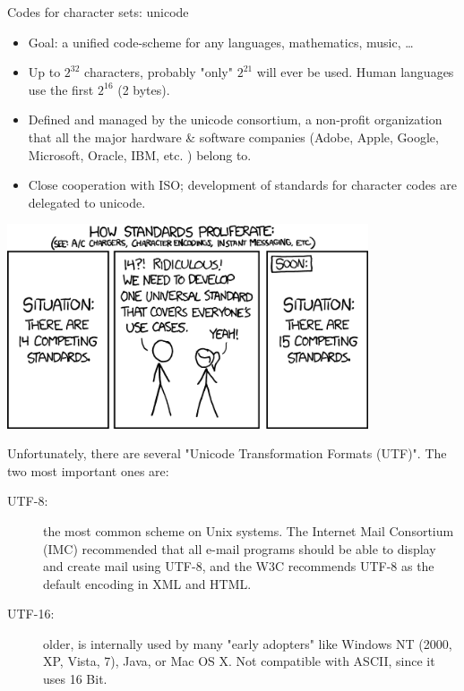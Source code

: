 \documentclass[11pt,compress,t,notes=noshow, xcolor=table]{beamer}
\begin{document}
\begin{vbframe}{Codes for character sets: unicode}
\begin{itemize}
\item Goal: a unified code-scheme for any
  languages, mathematics, music, \ldots
\item Up to $2^{32}$ characters, probably "only"
  $2^{21}$ will ever be used. Human languages use the
  first $2^{16}$ (2 bytes).
\item Defined and managed by the unicode consortium, a non-profit organization that
  all the major hardware \& software companies (Adobe, Apple, Google,
  Microsoft, Oracle, IBM, etc. ) belong to.\\


\item Close cooperation with ISO; development of standards for
  character codes are delegated to unicode.
\end{itemize}

\framebreak

  \begin{center}
    \includegraphics[width=0.8\textwidth]{figure_man/standards.png}
  \end{center}

\framebreak

Unfortunately, there are several "Unicode Transformation Formats (UTF)".
The two most important ones are:
\begin{description}
\item[UTF-8:] the most common scheme on Unix systems. The Internet Mail Consortium (IMC) recommended that all e-mail programs should be able to display and create mail using UTF-8, and the W3C recommends UTF-8 as the default encoding in XML and HTML. 
\item[UTF-16:] older, is internally used by many "early adopters" like
  Windows NT (2000, XP, Vista, 7), Java, or Mac OS X. Not
  compatible with ASCII, since it uses 16 Bit.
\end{description}


\end{vbframe}
\end{document}
